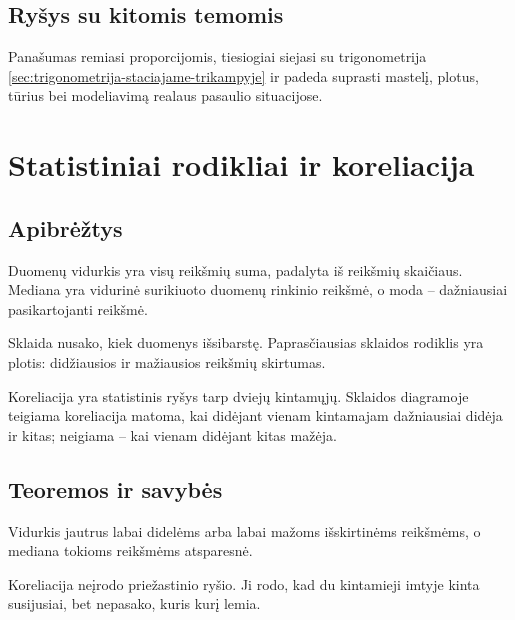 \subsection{Ryšys su kitomis temomis}

Panašumas remiasi proporcijomis, tiesiogiai siejasi su trigonometrija \ref{sec:trigonometrija-staciajame-trikampyje} ir padeda suprasti mastelį, plotus, tūrius bei modeliavimą realaus pasaulio situacijose.

\section{Statistiniai rodikliai ir koreliacija}\label{sec:statistiniai-rodikliai-ir-koreliacija}

\subsection{Apibrėžtys}

\begin{apibreztis}
Duomenų vidurkis yra visų reikšmių suma, padalyta iš reikšmių skaičiaus. Mediana yra vidurinė surikiuoto duomenų rinkinio reikšmė, o moda -- dažniausiai pasikartojanti reikšmė.
\end{apibreztis}

\begin{apibreztis}
Sklaida nusako, kiek duomenys išsibarstę. Paprasčiausias sklaidos rodiklis yra plotis: didžiausios ir mažiausios reikšmių skirtumas.
\end{apibreztis}

\begin{apibreztis}
Koreliacija yra statistinis ryšys tarp dviejų kintamųjų. Sklaidos diagramoje teigiama koreliacija matoma, kai didėjant vienam kintamajam dažniausiai didėja ir kitas; neigiama -- kai vienam didėjant kitas mažėja.
\end{apibreztis}

\subsection{Teoremos ir savybės}

\begin{savybe}
Vidurkis jautrus labai didelėms arba labai mažoms išskirtinėms reikšmėms, o mediana tokioms reikšmėms atsparesnė.
\end{savybe}

\begin{savybe}
Koreliacija neįrodo priežastinio ryšio. Ji rodo, kad du kintamieji imtyje kinta susijusiai, bet nepasako, kuris kurį lemia.
\end{savybe}

